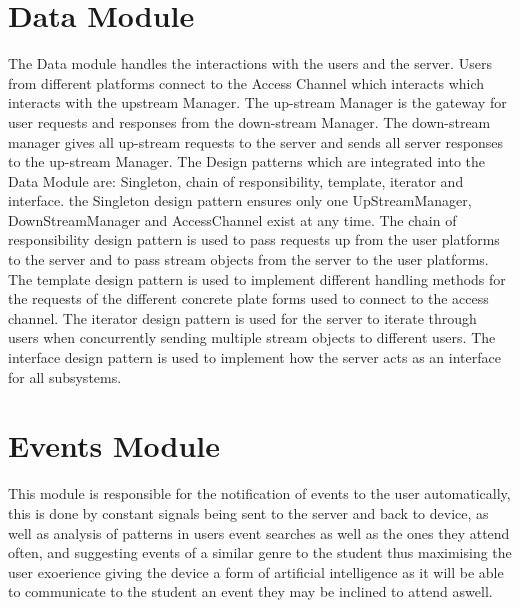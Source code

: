 \section{Data Module}
	The Data module handles the interactions with the users and the server. Users from different platforms connect to the Access Channel which interacts which interacts with the upstream Manager. The up-stream Manager is the gateway for user requests and responses from the down-stream Manager. The down-stream manager gives all up-stream requests to the server and sends all server responses to the up-stream Manager. The Design patterns which are integrated into the Data Module are: Singleton, chain of responsibility, template, iterator and interface. the Singleton design pattern ensures only one UpStreamManager, DownStreamManager and AccessChannel exist at any time. The chain of responsibility design pattern is used to pass requests up from the user platforms to the server and to pass stream objects from the server to the user platforms. The template design pattern is used to implement different handling methods for the requests of the different concrete plate forms used to connect to the access channel. The iterator design pattern is used for the server to iterate through users when concurrently sending multiple stream objects to different users. The interface design pattern is used to implement how the server acts as an interface for all subsystems.

\section{Events Module}
This module is responsible for the notification of events to the user automatically, this is done by constant signals being sent to the server and back to device, as well as analysis of patterns in users event searches as well as the ones they attend often, and suggesting events of a similar genre to the student thus maximising the user exoerience giving the device a form of artificial intelligence as it will be able to communicate to the student an event they may be inclined to attend aswell.
